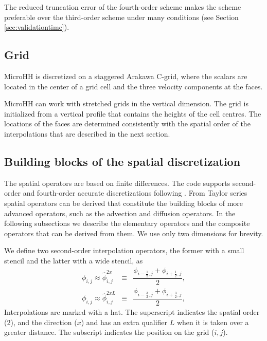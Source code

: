 \documentclass[gmd]{copernicus}
\begin{document}
The reduced truncation error of the fourth-order scheme makes the scheme preferable over the third-order scheme under many conditions (see Section \ref{sec:validationtime}).

\subsection{Grid}
MicroHH is discretized on a staggered Arakawa C-grid, where the scalars are located in the center of a grid cell and the three velocity components at the faces.

MicroHH can work with stretched grids in the vertical dimension. The grid is initialized from a vertical profile that contains the heights of the cell centres. The locations of the faces are determined consistently with the spatial order of the interpolations that are described in the next section.

\subsection{Building blocks of the spatial discretization}
The spatial operators are based on finite differences. The code supports second-order and fourth-order accurate discretizations following \citet{Morinishi1998, Vasilyev2000}. From Taylor series spatial operators can be derived that constitute the building blocks of more advanced operators, such as the advection and diffusion operators. In the following subsections we describe the elementary operators and the composite operators that can be derived from them. We use only two dimensions for brevity.

We define two second-order interpolation operators, the former with a small stencil and the latter with a wide stencil, as
\begin{eqnarray}
\phi_{i,j} \approx \widehat{\phi}^{2x }_{i,j} & \equiv & \dfrac{\phi_{i-\frac{1}{2},j} + \phi_{i+\frac{1}{2},j}}{2},\\
\phi_{i,j} \approx \widehat{\phi}^{2xL}_{i,j} & \equiv & \dfrac{\phi_{i-\frac{3}{2},j} + \phi_{i+\frac{3}{2},j}}{2},
\end{eqnarray}
Interpolations are marked with a hat. The superscript indicates the spatial order (2), and the direction ($x$) and has an extra qualifier $L$ when it is taken over a greater distance. The subscript indicates the position on the grid ($i,j$).
\end{document}
